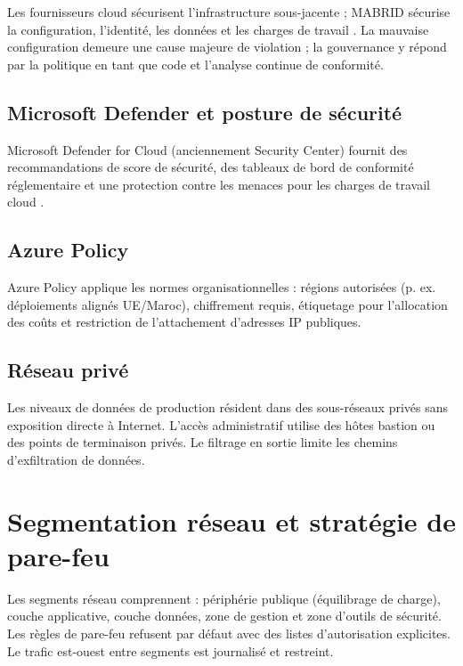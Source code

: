 Les fournisseurs cloud sécurisent l'infrastructure sous-jacente ; MABRID sécurise la configuration, l'identité, les données et les charges de travail \parencite{microsoftSharedResp}. La mauvaise configuration demeure une cause majeure de violation ; la gouvernance y répond par la politique en tant que code et l'analyse continue de conformité.

\subsection{Microsoft Defender et posture de sécurité}

Microsoft Defender for Cloud (anciennement Security Center) fournit des recommandations de score de sécurité, des tableaux de bord de conformité réglementaire et une protection contre les menaces pour les charges de travail cloud \parencite{microsoftDefenderCloud}.

\subsection{Azure Policy}

Azure Policy applique les normes organisationnelles : régions autorisées (p. ex. déploiements alignés UE/Maroc), chiffrement requis, étiquetage pour l'allocation des coûts et restriction de l'attachement d'adresses IP publiques.

\subsection{Réseau privé}

Les niveaux de données de production résident dans des sous-réseaux privés sans exposition directe à Internet. L'accès administratif utilise des hôtes bastion ou des points de terminaison privés. Le filtrage en sortie limite les chemins d'exfiltration de données.

\section{Segmentation réseau et stratégie de pare-feu}

Les segments réseau comprennent : périphérie publique (équilibrage de charge), couche applicative, couche données, zone de gestion et zone d'outils de sécurité. Les règles de pare-feu refusent par défaut avec des listes d'autorisation explicites. Le trafic est-ouest entre segments est journalisé et restreint.


